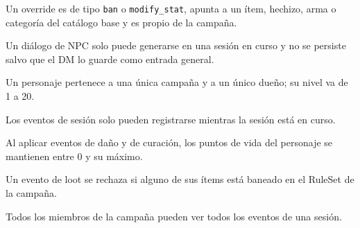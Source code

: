 \begin{description}[leftmargin=2.2cm,labelwidth=2cm,itemsep=2pt]
\item[RD-014] Un override es de tipo \texttt{ban} o \texttt{modify\_\allowbreak{}stat}, apunta a un ítem, hechizo, arma o categoría del catálogo base y es propio de la campaña.
\item[RD-015] Un diálogo de NPC solo puede generarse en una sesión en curso y no se persiste salvo que el DM lo guarde como entrada general.
\item[RD-016] Un personaje pertenece a una única campaña y a un único dueño; su nivel va de 1 a 20.
\item[RD-017] Los eventos de sesión solo pueden registrarse mientras la sesión está en curso.
\item[RD-018] Al aplicar eventos de daño y de curación, los puntos de vida del personaje se mantienen entre 0 y su máximo.
\item[RD-019] Un evento de loot se rechaza si alguno de sus ítems está baneado en el RuleSet de la campaña.
\item[RD-020] Todos los miembros de la campaña pueden ver todos los eventos de una sesión.
\end{description}
